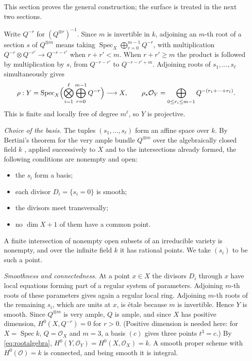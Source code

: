 \documentclass[11pt,a4paper]{article}
\theoremstyle{plain}
\theoremstyle{remark}
\newcommand{\OO}{\mathcal O}
\newcommand{\Spec}{\operatorname{Spec}}
\begin{document}
This section proves the general construction; the surface is treated in the next two sections.

Write $Q^{-r}$ for $(Q^{\otimes r})^{-1}$. Since $m$ is invertible in $k$, adjoining an $m$-th root of a section $s$ of
$Q^{\otimes m}$ means taking $\Spec_X\bigoplus_{r=0}^{m-1}Q^{-r}$, with multiplication
$Q^{-r}\otimes Q^{-r'}\to Q^{-r-r'}$ when $r+r'<m$. When $r+r'\ge m$ the product is followed by multiplication by $s$,
from $Q^{-r-r'}$ to $Q^{-r-r'+m}$. Adjoining roots of $s_1,\dots,s_\ell$ simultaneously gives
\begin{equation}\label{eq:rootalgebra}
 \rho:Y=\Spec_X\Bigl(\bigotimes_{i=1}^\ell\bigoplus_{r=0}^{m-1}Q^{-r}\Bigr)\longrightarrow X,\qquad
 \rho_*\OO_Y=\bigoplus_{0\le r_i\le m-1}Q^{-(r_1+\cdots+r_\ell)} .
\end{equation}
This is finite and locally free of degree $m^\ell$, so $Y$ is projective.

\emph{Choice of the basis.} The tuples $(s_1,\dots,s_\ell)$ form an affine space over $k$. By Bertini's theorem for the
very ample bundle $Q^{\otimes m}$ over the algebraically closed field $k$ \cite[II.8.18]{Hartshorne}, applied
successively to $X$ and to the intersections already formed, the following conditions are nonempty and open:
\begin{itemize}
\item the $s_i$ form a basis;
\item each divisor $D_i=\{s_i=0\}$ is smooth;
\item the divisors meet transversally;
\item no $\dim X+1$ of them have a common point.
\end{itemize}
A finite intersection of nonempty open subsets of an irreducible variety is nonempty, and over the infinite field $k$
it has rational points. We take $(s_i)$ to be such a point.

\emph{Smoothness and connectedness.} At a point $x\in X$ the divisors $D_i$ through $x$ have local equations forming
part of a regular system of parameters. Adjoining $m$-th roots of these parameters gives again a regular local ring.
Adjoining $m$-th roots of the remaining $s_i$, which are units at $x$, is étale because $m$ is invertible. Hence $Y$ is
smooth. Since $Q^{\otimes m}$ is very ample, $Q$ is ample, and since $X$ has positive dimension,
$H^0(X,Q^{-r})=0$ for $r>0$. (Positive dimension is needed here: for $X=\Spec k$, $Q=\OO_X$ and $m=3$, a basis
$(c)$ gives three points $t^3=c$.) By
\eqref{eq:rootalgebra}, $H^0(Y,\OO_Y)=H^0(X,\OO_X)=k$. A smooth proper scheme with $H^0(\OO)=k$ is connected, and
being smooth it is integral.
\end{document}

